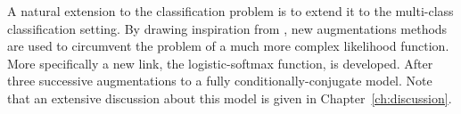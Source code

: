 



\graphicspath{{4/figures/}}

A natural extension to the classification problem is to extend it to the multi-class classification setting.
By drawing inspiration from \citet{donner2018efficientdensity}, new augmentations methods are used to circumvent the problem of a much more complex likelihood function.
More specifically a new link, the logistic-softmax function, is developed.
After three successive augmentations to a fully conditionally-conjugate model.
Note that an extensive discussion about this model is given in Chapter~\ref{ch:discussion}.


